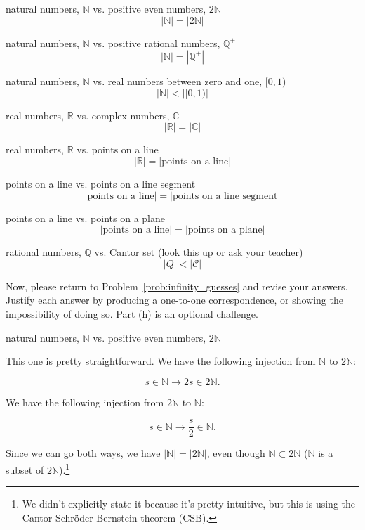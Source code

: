 \documentclass[../key.tex]{subfiles}
\begin{document}
\begin{inner_problem}[start=1]
\item natural numbers, $\mathbb{N}$ vs. positive even numbers, $2\mathbb{N}$
$$|\mathbb{N}|=|2\mathbb{N}|$$
\item natural numbers, $\mathbb{N}$ vs. positive rational numbers, $\mathbb{Q}^+$
$$|\mathbb{N}|=\left|\mathbb{Q}^+\right|$$
\item natural numbers, $\mathbb{N}$ vs. real numbers between zero and one, $[0,1)$
$$|\mathbb{N}|<|[0,1)|$$
\item real numbers, $\mathbb{R}$ vs. complex numbers, $\mathbb{C}$
$$|\mathbb{R}|=|\mathbb{C}|$$
\item real numbers, $\mathbb{R}$ vs. points on a line
{\normalfont
$$|\mathbb{R}|=|\text{points on a line}|$$}
\item points on a line vs. points on a line segment
{\normalfont
$$|\text{points on a line}|=|\text{points on a line segment}|$$}
\item points on a line vs. points on a plane
{\normalfont
$$|\text{points on a line}|=|\text{points on a plane}|$$}
\item rational numbers, $\mathbb{Q}$ vs. Cantor set (look this up or ask your teacher)
$$|Q|<|\mathcal{C}|$$
\end{inner_problem}

\begin{outer_problem}
\item Now, please return to Problem~\ref{prob:infinity_guesses} and revise your answers. Justify each answer by producing a one-to-one correspondence, or showing the impossibility of doing so. Part (h) is an optional challenge.
\end{outer_problem}

\begin{inner_problem}[start=1]
\item natural numbers, $\mathbb{N}$ vs. positive even numbers, $2\mathbb{N}$
\end{inner_problem}

\noindent This one is pretty straightforward. We have the following injection from $\mathbb{N}$ to $2\mathbb{N}$:

$$s\in \mathbb{N} \to 2s\in 2\mathbb{N}.$$

\noindent We have the following injection from $2\mathbb{N}$ to $\mathbb{N}$:

$$s\in \mathbb{N} \to \frac{s}{2}\in \mathbb{N}.$$

\noindent Since we can go both ways, we have $|\mathbb{N}| = |2\mathbb{N}|$, even though $\mathbb{N}\subset 2\mathbb{N}$ ($\mathbb{N}$ is a subset of $2\mathbb{N}$).\footnote{We didn't explicitly state it because it's pretty intuitive, but this is using the Cantor-Schröder-Bernstein theorem (CSB).}
\end{document}

